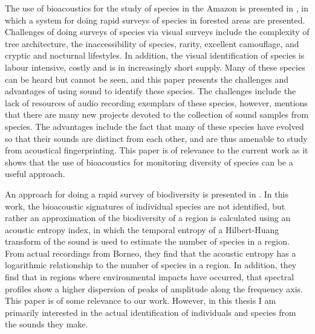 \documentclass[12pt,oneside]{book}
\begin{document}
The use of bioacoustics for the study of species in the Amazon is
presented in \cite{riede1993monitoring}, in which a system for doing
rapid surveys of species in forested areas are presented.  Challenges
of doing surveys of species via visual surveys include the complexity
of tree architecture, the inaccessibility of species, rarity,
excellent camouflage, and cryptic and nocturnal lifestyles.  In
addition, the visual identification of species is labour intensive,
costly and is in increasingly short supply.  Many of these species can
be heard but cannot be seen, and this paper presents the challenges
and advantages of using sound to identify these species.  The
challenges include the lack of resources of audio recording exemplars
of these species, however, mentions that there are many new projects
devoted to the collection of sound samples from species.  The
advantages include the fact that many of these species have evolved so
that their sounds are distinct from each other, and are thus amenable
to study from acoustical fingerprinting.  This paper is of relevance to
the current work as it shows that the use of bioacoustics for
monitoring diversity of species can be a useful approach.

An approach for doing a rapid survey of biodiversity is presented in
\cite{sueur2008rapid}.  In this work, the bioacoustic signatures of
individual species are not identified, but rather an approximation of
the biodiversity of a region is calculated using an acoustic entropy
index, in which the temporal entropy of a Hilbert-Huang transform of
the sound is used to estimate the number of species in a region.  From
actual recordings from Borneo, they find that the acoustic entropy has
a logarithmic relationship to the number of species in a region.  In
addition, they find that in regions where environmental impacts have
occurred, that spectral profiles show a higher dispersion of peaks of
amplitude along the frequency axis.  This paper is of some relevance
to our work.  However, in this thesis I am primarily interested in
the actual identification of individuals and species from the sounds
they make.
\end{document}
